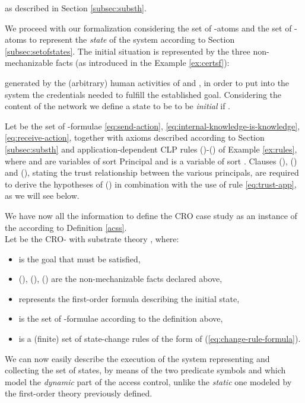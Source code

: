 \documentclass[conference]{llncs}
\newcommand{\CRO}{CRO}
\begin{document}
{as described in Section \ref{subsec:substh}.

We proceed with our formalization considering the set  of -atoms
and the set  of -atoms to represent the \textit{state} of the system according to Section \ref{subsec:setofstates}.
The initial situation is represented by the three non-mechanizable facts (as introduced in the Example \ref{ex:certsf}): 

generated by the (arbitrary) human activities of  and , in order to put into the system the credentials needed to fulfill the established goal.
Considering the content of the network we define a state to be to be \textit{initial} if .

Let  be the set of -formulae \eqref{eq:send-action}, \eqref{eq:internal-knowledge-is-knowledge}, \eqref{eq:receive-action}, together with axioms described according to Section \ref{subsec:substh} and application-dependent CLP rules ()-() of Example \ref{ex:rules},
where  and  are variables of sort \mbox{Principal} and  is a
variable of sort . 
Clauses (), () and (), stating the
trust relationship between the various principals, are required to
derive the hypotheses of () in combination with the use of rule
\eqref{eq:trust-app}, as we will see below.

We have now all the information to define the \CRO{} case study as an instance of the  according to Definition \ref{acss}. \\

  Let  be the \CRO{}- with substrate
  theory , where:
\begin{itemize}
\item  is the goal  that must be satisfied, 
\item (), (), () are the non-mechanizable facts declared above,
 \item  represents the first-order formula describing the initial state,
 \item  is the set of -formulae according to the definition above,
 \item  is a (finite) set of state-change rules of the form of (\ref{eq:change-rule-formula}).
\end{itemize}  
  
We can now easily describe the execution of the system representing and collecting the set  of states,
by means of the two predicate symbols  and  which model the \textit{dynamic} part of the access control, unlike the \textit{static} one modeled by the first-order theory  previously defined. 

}
\end{document}

